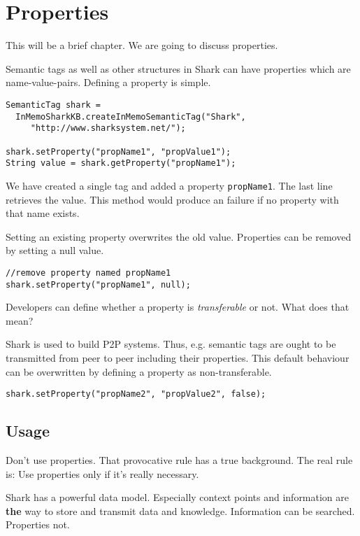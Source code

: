 \chapter{Properties}
This will be a brief chapter. We are going to discuss properties. 

Semantic tags as well as other structures in Shark can have properties which are name-value-pairs. Defining a property is simple.

\begin{verbatim}
SemanticTag shark = 
  InMemoSharkKB.createInMemoSemanticTag("Shark", 
     "http://www.sharksystem.net/");

shark.setProperty("propName1", "propValue1");
String value = shark.getProperty("propName1");

\end{verbatim}

We have created a single tag and added a property {\tt propName1}. The last line retrieves the value. This method would produce an failure if no property with that name exists.

Setting an existing property overwrites the old value. Properties can be removed by setting a null value.

\begin{verbatim}
//remove property named propName1
shark.setProperty("propName1", null);
\end{verbatim}

Developers can define whether a property is {\it transferable} or not. What does that mean?

Shark is used to build P2P systems. Thus, e.g. semantic tags are ought to be transmitted from peer to peer including their properties. This default behaviour
can be overwritten by defining a property as non-transferable.

\begin{verbatim}
shark.setProperty("propName2", "propValue2", false);
\end{verbatim}

\section{Usage}
Don't use properties. That provocative rule has a true background. The real rule is: Use properties only if it's really necessary.

Shark has a powerful data model. Especially context points and information are {\bf the} way to store and transmit data and knowledge. Information can be searched. Properties not.

